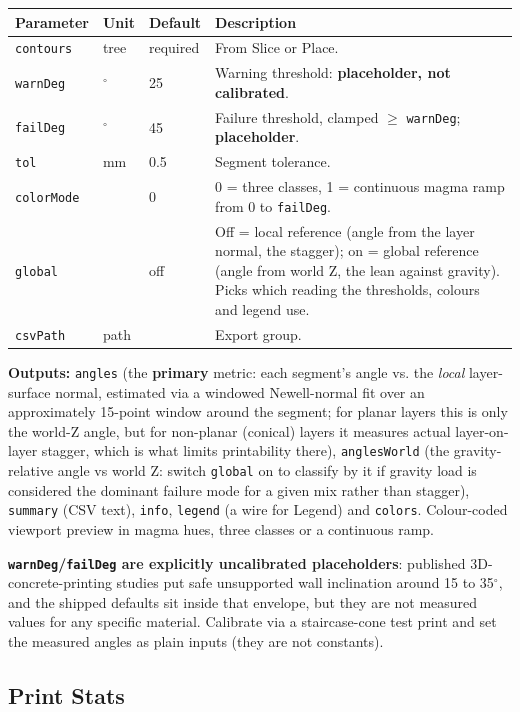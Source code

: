\documentclass[11pt]{article}
\newcommand{\param}[1]{\texttt{#1}}
\newcommand{\iamdeg}{$^{\circ}$}
\begin{document}
\begin{longtable}{@{}p{3.2cm}p{2.0cm}p{2.0cm}p{6.4cm}@{}}
\toprule
\textbf{Parameter} & \textbf{Unit} & \textbf{Default} & \textbf{Description} \\
\midrule
\endhead
\param{contours} & tree & required & From Slice or Place. \\
\param{warnDeg} & \iamdeg{} & 25 & Warning threshold: \textbf{placeholder, not calibrated}. \\
\param{failDeg} & \iamdeg{} & 45 & Failure threshold, clamped $\geq$ \param{warnDeg}; \textbf{placeholder}. \\
\param{tol} & mm & 0.5 & Segment tolerance. \\
\param{colorMode} & & 0 & 0 = three classes, 1 = continuous magma ramp from 0 to \param{failDeg}. \\
\param{global} & & off & Off = local reference (angle from the layer normal, the stagger); on = global reference (angle from world Z, the lean against gravity). Picks which reading the thresholds, colours and legend use. \\
\param{csvPath} & path & & Export group. \\
\bottomrule
\end{longtable}

\textbf{Outputs:} \param{angles} (the \textbf{primary} metric: each
segment's angle vs. the \emph{local} layer-surface normal, estimated via
a windowed Newell-normal fit over an approximately 15-point window around
the segment; for planar layers this is only the world-Z angle, but for
non-planar (conical) layers it measures actual layer-on-layer
stagger, which is what limits printability there),
\param{anglesWorld} (the gravity-relative angle vs world Z: switch
\param{global} on to classify by it if gravity load is considered the
dominant failure mode for a given mix rather than stagger),
\param{summary} (CSV text), \param{info}, \param{legend} (a wire for
Legend) and \param{colors}. Colour-coded viewport preview in
magma hues, three classes or a continuous ramp.

\textbf{\param{warnDeg}/\param{failDeg} are explicitly uncalibrated
placeholders}: published 3D-concrete-printing studies put safe
unsupported wall inclination around 15 to 35\iamdeg, and the shipped defaults
sit inside that envelope, but they are not measured values for any
specific material. Calibrate via a staircase-cone test print and set the
measured angles as plain inputs (they are not constants).

\subsection{Print Stats}
\end{document}
